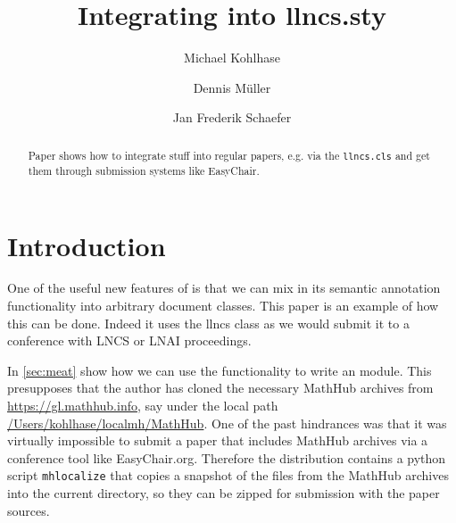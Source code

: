 \documentclass{llncs}
\title{Integrating \protect\sTeX into llncs.sty}
\author{Michael Kohlhase\orcidID{0000-0002-9859-6337} \and Dennis M\"uller\orcidID{0000-0002-4482-4912} \and Jan Frederik Schaefer}
\institute{Computer Science, FAU  Erlangen-N\"urnberg}
\begin{document}
\maketitle
\begin{abstract}
  Paper shows how to integrate \sTeX stuff into regular papers, e.g. via the
  \texttt{llncs.cls} and get them through submission systems like EasyChair.
\end{abstract}

\section{Introduction}\label{sec:intro}

One of the useful new features of \sTeX is that we can mix in its semantic annotation
functionality into arbitrary document classes. This paper is an example of how this can be
done. Indeed it uses the \textsf{llncs} class as we would submit it to a conference with
LNCS or LNAI proceedings.

In \cref{sec:meat} show how we can use the \sTeX functionality to write an \sTeX module.
This presupposes that the author has cloned the necessary MathHub archives from
\url{https://gl.mathhub.info}, say under the local path
\url{/Users/kohlhase/localmh/MathHub}. One of the past hindrances was that it was
virtually impossible to submit a paper that includes MathHub archives via a conference
tool like EasyChair.org. Therefore the \sTeX distribution contains a python script
\texttt{mhlocalize} that copies a snapshot of the \sTeX files from the MathHub archives
into the current directory, so they can be zipped for submission with the paper sources. 
\end{document}
